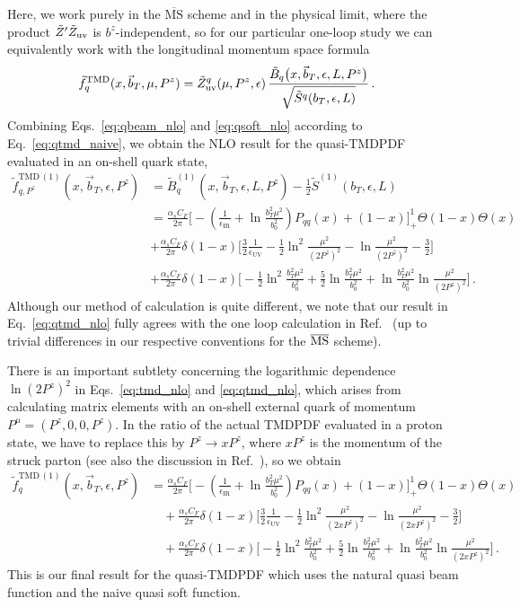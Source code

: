 \documentclass[11pt,a4paper]{article}
\DeclareRobustCommand{\eq}[1]{Eq.~\eqref{eq:#1}}
\DeclareRobustCommand{\eqs}[2]{Eqs.~\eqref{eq:#1} and \eqref{eq:#2}}
\DeclareRobustCommand{\mycite}[1]{Ref.~\cite{#1}}
\newcommand{\MS}{\overline{\mathrm{MS}}}
\newcommand{\eps}{\epsilon}
\newcommand{\nn}{\nonumber}
\newcommand{\as}{\alpha_s}
\newcommand{\UV}{\mathrm{UV}}
\newcommand{\IR}{\mathrm{IR}}
\newcommand\TMD{\mathrm{TMD}}
\newcommand{\Lb}[1]{\ln^{#1}\frac{b_T^2 \mu^2}{b_0^2}}
\newcommand{\bt}{\vec b_T}
\begin{document}
Here, we work purely in the $\MS$ scheme and in the physical limit, where the product $\tilde Z' \tilde Z_{\rm uv}$ is $b^z$-independent, so for our particular one-loop study we can equivalently work with the longitudinal momentum space formula
\begin{align} \label{eq:qtmd_naive}
 \tilde f^\TMD_q(x, \bt, \mu , P^z) &
 = \tilde Z_{\rm uv}^q(\mu,P^z,\epsilon)\, \frac{\tilde B_q\bigl(x, \bt, \epsilon, L, P^z \bigr)}{\sqrt{\tilde S^q(b_T,\epsilon,L)}}
\,.\end{align}
%
Combining \eqs{qbeam_nlo}{qsoft_nlo} according to \eq{qtmd_naive}, we obtain the NLO result for the quasi-TMDPDF evaluated in an on-shell quark state,
\begin{align} \label{eq:qtmd_nlo}
 \tilde f_{q,P^z}^{\TMD\,(1)}(x,\bt,\eps,P^z) &
 = \tilde B_{q}^{(1)}(x, \bt, \eps, L, P^z) - \frac{1}{2} \tilde S^{(1)}(b_T,\eps,L)
\\\nn&
 = \frac{\as C_F}{2\pi} \biggl[ - \left(\frac{1}{\eps_\IR} + \Lb{} \right) P_{qq}(x)
   +  (1-x) \biggr]_+^1 \Theta(1-x)\Theta(x)
 \\\nn&
 + \frac{\as C_F}{2\pi} \delta(1-x) \biggl[ \frac{3}{2} \frac{1}{\eps_\UV}
   - \frac{1}{2} \ln^2\frac{\mu^2}{(2P^z)^2} - \ln\frac{\mu^2}{(2P^z)^2} - \frac{3}{2} \biggr]
 \\\nn&
 + \frac{\as C_F}{2\pi} \delta(1-x) \biggl[
  - \frac{1}{2} \Lb{2} + \frac{5}{2} \Lb{} + \Lb{} \ln\frac{\mu^2}{(2P^z)^2}
   \biggr]
\,.\end{align}
Although our method of calculation is quite different, we note that our result in \eq{qtmd_nlo} fully agrees with the one loop calculation in \mycite{Ji:2018hvs} (up to trivial differences in our respective conventions for the $\overline{\rm MS}$ scheme).

There is an important subtlety concerning the logarithmic dependence $\ln(2P^z)^2$ in \eqs{tmd_nlo}{qtmd_nlo},
which arises from calculating matrix elements with an on-shell external quark of momentum $P^\mu = (P^z, 0, 0, P^z)$.
In the ratio of the actual TMDPDF evaluated in a proton state, we have to replace this by $P^z\to x P^z$, where $x P^z$ is the momentum  of the struck parton (see also the discussion in \mycite{Izubuchi:2018srq}), so we obtain
\begin{align} \label{eq:qtmd_nloxP}
 \tilde f_{q}^{\TMD\,(1)}(x,\bt,\eps,P^z) &
 = \frac{\as C_F}{2\pi} \biggl[ - \left(\frac{1}{\eps_\IR} + \Lb{} \right) P_{qq}(x)
   +  (1-x) \biggr]_+^1 \Theta(1-x)\Theta(x)
 \nn\\&\quad
 + \frac{\as C_F}{2\pi} \delta(1-x) \biggl[ \frac{3}{2} \frac{1}{\eps_\UV}
   - \frac{1}{2} \ln^2\frac{\mu^2}{(2xP^z)^2} - \ln\frac{\mu^2}{(2xP^z)^2} - \frac{3}{2} \biggr]
 \nn\\&\quad
 + \frac{\as C_F}{2\pi} \delta(1-x) \biggl[
  - \frac{1}{2} \Lb{2} + \frac{5}{2} \Lb{} + \Lb{} \ln\frac{\mu^2}{(2xP^z)^2}
   \biggr]
\,.\end{align}
This is our final result for the quasi-TMDPDF which uses the natural quasi beam function and the naive quasi soft function.
\end{document}
